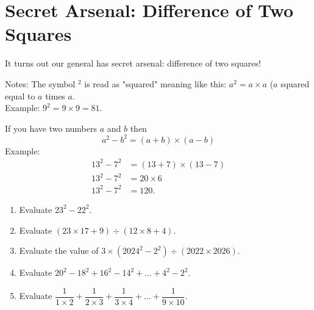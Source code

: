 \documentclass[11pt]{scrartcl}
\begin{document}
\section{Secret Arsenal: Difference of Two Squares}
\begin{tcolorbox}[colback=green!10,colframe=green!75!black]
It turns out our general has secret arsenal: difference of two squares!
\end{tcolorbox}
\begin{remark*}
    Notes: The symbol $^2$ is read as "squared" meaning like this: $a^2 = a \times a$ ($a$ squared equal to $a$ times $a$.\\
    Example: $9^2 = 9 \times 9 = 81$.
\end{remark*}
\begin{lemma*}
    If you have two numbers $a$ and $b$ then $$a^2-b^2 = (a+b) \times (a-b)$$
    Example: 
    \begin{align*}
        13^2-7^2 &= (13+7) \times (13-7)\\
        13^2-7^2 &= 20 \times 6\\
        13^2-7^2 &= \boxed{120}.
    \end{align*}
\end{lemma*}
\begin{enumerate}[resume]
    \item Evaluate $23^2-22^2$.
    \vspace{3cm} \item Evaluate $(23 \times 17 + 9) \div (12 \times 8 + 4).$
    \vspace{3cm} \item Evaluate the value of $3 \times (2024^2 - 2^2) \div (2022 \times 2026)$.
    \vspace{3cm} \item Evaluate $20^2-18^2+16^2-14^2+\dots+4^2-2^2$.
    \vspace{3cm} \item Evaluate $\dfrac{1}{1 \times 2} + \dfrac{1}{2 \times 3} + \dfrac{1}{3 \times 4} + \dots + \dfrac{1}{9 \times 10}$.
\end{enumerate}
\end{document}
